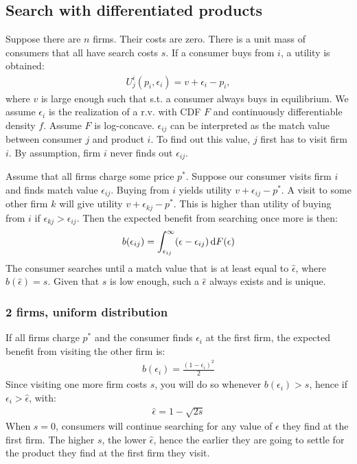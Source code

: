 \subsection{Search with differentiated products}
Suppose there are $n$ firms. Their costs are zero. There is a unit mass
of consumers that all have search costs $s$. If a consumer buys from $i$,
a utility is obtained:
\begin{align}
	U^i_j(p_i,\epsilon_i)=v+\epsilon_i-p_i,
\end{align}
where $v$ is large enough such that s.t. a consumer always buys in
equilibrium. We assume $\epsilon_i$ is the realization of a r.v. with
CDF $F$ and continuously differentiable density $f$. Assume $F$ is
log-concave. $\epsilon_{ij}$ can be interpreted as the match value
between consumer $j$ and product $i$. To find out this value, $j$ first
has to visit firm $i$. By assumption, firm $i$ never finds out
$\epsilon_{ij}$.

Assume that all firms charge some price $p^*$. Suppose our consumer
visits firm $i$ and finds match value $\epsilon_{ij}$. Buying from $i$
yields utility $v+\epsilon_{ij}-p^*$. A visit to some other firm $k$ will
give utility $v+\epsilon_{kj}-p^*$. This is higher than utility of buying
from $i$ if $\epsilon_{kj}>\epsilon_{ij}$. Then the expected benefit from
searching once more is then:
\begin{align}
	b(\epsilon_{ij})=\int_{\epsilon_{ij}}^\infty(\epsilon-\epsilon_{ij})\,\textrm{d}F(\epsilon)
	\label{eq:ch2expben}
\end{align}
The consumer searches until a match value that is at least equal to
$\hat\epsilon$, where $b(\hat\epsilon)=s$. Given that $s$ is low enough,
such a $\hat\epsilon$ always exists and is unique.
\subsubsection{2 firms, uniform distribution}
If all firms charge $p^*$ and the consumer finds $\epsilon_i$ at the first
firm, the expected benefit from visiting the other firm is:
\begin{align}
	b(\epsilon_i)=\frac{(1-\epsilon_i)^2}{2}
\end{align}
Since visiting one more firm costs $s$, you will do so whenever
$b(\epsilon_i)>s$, hence if $\epsilon_i>\hat\epsilon$, with:
\begin{align}
	\hat\epsilon=1-\sqrt{2s}
	\label{eq:epshat}
\end{align}
When $s=0$, consumers will continue searching for any value of $\epsilon$
they find at the first firm. The higher $s$, the lower $\hat\epsilon$,
hence the earlier they are going to settle for the product they find at
the first firm they visit.

